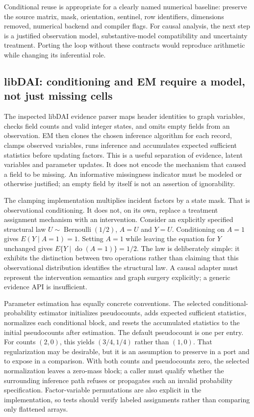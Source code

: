Conditional reuse is appropriate for a clearly named numerical baseline: preserve the source matrix, mask, orientation, sentinel, row identifiers, dimensions removed, numerical backend and compiler flags. For causal analysis, the next step is a justified observation model, substantive-model compatibility and uncertainty treatment. Porting the loop without these contracts would reproduce arithmetic while changing its inferential role.\citep{exec25_ctm_choice}

\subsection*{libDAI: conditioning and EM require a model, not just missing cells}
The inspected libDAI evidence parser maps header identities to graph variables, checks field counts and valid integer states, and omits empty fields from an observation. EM then clones the chosen inference algorithm for each record, clamps observed variables, runs inference and accumulates expected sufficient statistics before updating factors. This is a useful separation of evidence, latent variables and parameter updates. It does not encode the mechanism that caused a field to be missing. An informative missingness indicator must be modeled or otherwise justified; an empty field by itself is not an assertion of ignorability.\citep{exec25_ctm_libdai}

The clamping implementation multiplies incident factors by a state mask. That is observational conditioning. It does not, on its own, replace a treatment assignment mechanism with an intervention. Consider an explicitly specified structural law $U\sim\operatorname{Bernoulli}(1/2)$, $A=U$ and $Y=U$. Conditioning on $A=1$ gives $E(Y\mid A=1)=1$. Setting $A=1$ while leaving the equation for $Y$ unchanged gives $E\{Y\mid\operatorname{do}(A=1)\}=1/2$. The law is deliberately simple: it exhibits the distinction between two operations rather than claiming that this observational distribution identifies the structural law. A causal adapter must represent the intervention semantics and graph surgery explicitly; a generic evidence API is insufficient.\citep{exec25_ctm_libdai,exec25_ctm_choice}

Parameter estimation has equally concrete conventions. The selected conditional-probability estimator initializes pseudocounts, adds expected sufficient statistics, normalizes each conditional block, and resets the accumulated statistics to the initial pseudocounts after estimation. The default pseudocount is one per entry. For counts $(2,0)$, this yields $(3/4,1/4)$ rather than $(1,0)$. That regularization may be desirable, but it is an assumption to preserve in a port and to expose in a comparison. With both counts and pseudocounts zero, the selected normalization leaves a zero-mass block; a caller must qualify whether the surrounding inference path refuses or propagates such an invalid probability specification. Factor-variable permutations are also explicit in the implementation, so tests should verify labeled assignments rather than comparing only flattened arrays.\citep{exec25_ctm_libdai,exec25_ctm_choice}


